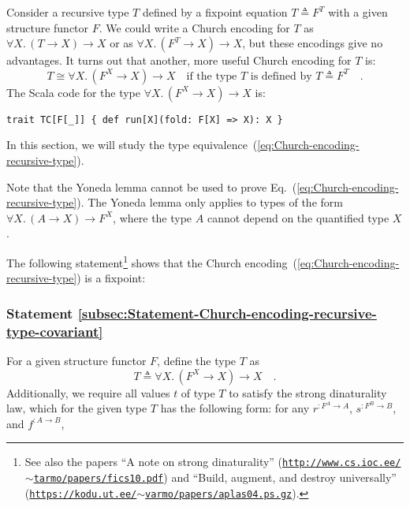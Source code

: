 Consider a recursive type $T$ defined by a fixpoint equation $T\triangleq F^{T}$
with a given structure functor $F$. We could write a Church encoding
for $T$ as $\forall X.\,(T\rightarrow X)\rightarrow X$ or as $\forall X.\,(F^{T}\rightarrow X)\rightarrow X$,
but these encodings give no advantages. It turns out that another,
more useful Church encoding for $T$ is:
\begin{equation}
T\cong\forall X.\,(F^{X}\rightarrow X)\rightarrow X\quad\text{if the type }T\text{ is defined by }T\triangleq F^{T}\quad.\label{eq:Church-encoding-recursive-type}
\end{equation}
The Scala code for the type $\forall X.\,(F^{X}\rightarrow X)\rightarrow X$
is:
\begin{lstlisting}
trait TC[F[_]] { def run[X](fold: F[X] => X): X }
\end{lstlisting}
In this section, we will study the type equivalence~(\ref{eq:Church-encoding-recursive-type}).

Note that the Yoneda lemma cannot be used to prove Eq.~(\ref{eq:Church-encoding-recursive-type}).
The Yoneda lemma only applies to types of the form $\forall X.\,(A\rightarrow X)\rightarrow F^{X}$,
where the type $A$ cannot depend on the quantified type $X$. 

The following statement\footnote{See also the papers \textsf{``}A note on strong dinaturality\textsf{''} (\texttt{\href{https://web.archive.org/web/20110601105059/http://www.cs.ioc.ee/~tarmo/papers/fics10.pdf}{http://www.cs.ioc.ee/$\sim$tarmo/papers/fics10.pdf}})
and \textsf{``}Build, augment, and destroy universally\textsf{''} (\texttt{\href{https://kodu.ut.ee/~varmo/papers/aplas04.ps.gz}{https://kodu.ut.ee/$\sim$varmo/papers/aplas04.ps.gz}}).} shows that the Church encoding~(\ref{eq:Church-encoding-recursive-type})
is a fixpoint:

\subsubsection{Statement \label{subsec:Statement-Church-encoding-recursive-type-covariant}\ref{subsec:Statement-Church-encoding-recursive-type-covariant}}

For a given structure functor $F$, define the type $T$ as
\[
T\triangleq\forall X.\,(F^{X}\rightarrow X)\rightarrow X\quad.
\]
Additionally, we require all values $t$ of type $T$ to satisfy the
strong dinaturality law,
which for the given type $T$ has the following form: for any $r^{:F^{A}\rightarrow A}$,
$s^{:F^{B}\rightarrow B}$, and $f^{:A\rightarrow B}$, 

